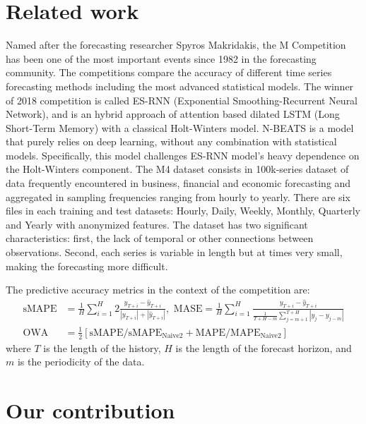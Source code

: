 \documentclass{article}
\begin{document}
\section{Related work}
Named after the forecasting researcher Spyros Makridakis, the M Competition has been one of the most important events since 1982 in the forecasting community.
The competitions compare the accuracy of different time series forecasting methods including the most advanced statistical models. The winner of 2018 competition is
called ES-RNN (Exponential Smoothing-Recurrent Neural Network), and is an hybrid approach of attention based dilated LSTM (Long Short-Term Memory) with a classical Holt-Winters model. 
N-BEATS is a model that purely relies on deep learning, without any combination with statistical models. Specifically, this model challenges ES-RNN model's heavy dependence on the Holt-Winters component.  
The M4 dataset consists in 100k-series dataset of data frequently encountered in business, financial and economic forecasting and aggregated in sampling frequencies ranging from hourly to yearly. There are six files in
each training and test datasets: Hourly, Daily, Weekly, Monthly, Quarterly and Yearly with anonymized features. The dataset has two significant characteristics: first, the lack of temporal or other connections between observations.
Second, each series is variable in length but at times very small, making the forecasting more difficult.

The predictive accuracy metrics in the context of the competition are:
\begin{align*}
	\text{sMAPE} &= \frac{1}{H} \sum_{i=1}^H 2 \frac{y_{T+i} - \hat{y}_{T+i}} {|y_{T+i}| + | \hat{y}_{T+i} |}, \text{ MASE} = \frac{1}{H} \sum_{i=1}^H \frac{y_{T+i} - \hat{y}_{T+i}} {\frac{1}{T+H-m} \sum_{j=m+1}^{T+H} |y_j - y_{j-m} |} \\
	\text{OWA} &= \frac{1}{2} [ \text{sMAPE} / \text{sMAPE}_{\text{Naive2}} + \text{MAPE} / \text{MAPE}_{\text{Naive2}} ]
\end{align*}
where $T$ is the length of the history, $H$ is the length of the forecast horizon, and $m$ is the periodicity of the data.

\section{Our contribution}
\end{document}
